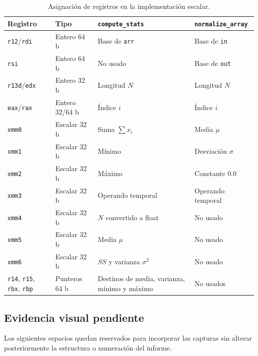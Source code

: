 \documentclass[journal]{IEEEtran}
\begin{document}
\begin{table}[H]
  \centering
  \caption{Asignación de registros en la implementación escalar.}
  \label{tab:registros-escalar}
  \scriptsize
  \setlength{\tabcolsep}{2.5pt}
  \begin{tabularx}{\columnwidth}{@{}>{\raggedright\arraybackslash}p{}
    >{\raggedright\arraybackslash}p{}
    >{\raggedright\arraybackslash}X
    >{\raggedright\arraybackslash}X@{}}
    \toprule
    Registro & Tipo & \texttt{compute\_stats} & \texttt{normalize\_array} \\
    \midrule
    \texttt{r12}/\texttt{rdi} & Entero 64 b & Base de \texttt{arr} & Base de
      \texttt{in} \\
    \texttt{rsi} & Entero 64 b & No usado & Base de \texttt{out} \\
    \texttt{r13d}/\texttt{edx} & Entero 32 b & Longitud $N$ & Longitud $N$ \\
    \texttt{eax}/\texttt{rax} & Entero 32/64 b & Índice $i$ & Índice $i$ \\
    \texttt{xmm0} & Escalar 32 b & Suma $\sum x_i$ & Media $\mu$ \\
    \texttt{xmm1} & Escalar 32 b & Mínimo & Desviación $\sigma$ \\
    \texttt{xmm2} & Escalar 32 b & Máximo & Constante $0.0$ \\
    \texttt{xmm3} & Escalar 32 b & Operando temporal & Operando temporal \\
    \texttt{xmm4} & Escalar 32 b & $N$ convertido a float & No usado \\
    \texttt{xmm5} & Escalar 32 b & Media $\mu$ & No usado \\
    \texttt{xmm6} & Escalar 32 b & $SS$ y varianza $\sigma^2$ & No usado \\
    \texttt{r14}, \texttt{r15},
      \texttt{rbx}, \texttt{rbp} & Punteros 64 b & Destinos de media,
      varianza, mínimo y máximo & No usados \\
    \bottomrule
  \end{tabularx}
\end{table}

\subsection{Evidencia visual pendiente}

Los siguientes espacios quedan reservados para incorporar las capturas sin
alterar posteriormente la estructura o numeración del informe.
\end{document}
